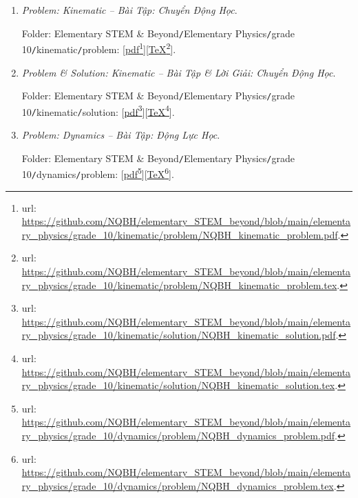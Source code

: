 \documentclass[12pt]{article}
\begin{document}
\begin{enumerate}
	\item {\it Problem: Kinematic -- Bài Tập: Chuyển Động Học}.
	
	Folder: {\sf Elementary STEM \& Beyond{\tt/}Elementary Physics{\tt/}grade 10{\tt/}kinematic{\tt/}problem}: [\href{https://github.com/NQBH/elementary_STEM_beyond/blob/main/elementary_physics/grade_10/kinematic/problem/NQBH_kinematic_problem.pdf}{pdf}\footnote{{\sc url}: \url{https://github.com/NQBH/elementary_STEM_beyond/blob/main/elementary_physics/grade_10/kinematic/problem/NQBH_kinematic_problem.pdf}.}][\href{https://github.com/NQBH/elementary_STEM_beyond/blob/main/elementary_physics/grade_10/kinematic/problem/NQBH_kinematic_problem.tex}{\TeX}\footnote{{\sc url}: \url{https://github.com/NQBH/elementary_STEM_beyond/blob/main/elementary_physics/grade_10/kinematic/problem/NQBH_kinematic_problem.tex}.}].
	\item {\it Problem \& Solution: Kinematic -- Bài Tập \& Lời Giải: Chuyển Động Học}.
	
	Folder: {\sf Elementary STEM \& Beyond{\tt/}Elementary Physics{\tt/}grade 10{\tt/}kinematic{\tt/}solution}: [\href{https://github.com/NQBH/elementary_STEM_beyond/blob/main/elementary_physics/grade_10/kinematic/solution/NQBH_kinematic_solution.pdf}{pdf}\footnote{{\sc url}: \url{https://github.com/NQBH/elementary_STEM_beyond/blob/main/elementary_physics/grade_10/kinematic/solution/NQBH_kinematic_solution.pdf}.}][\href{https://github.com/NQBH/elementary_STEM_beyond/blob/main/elementary_physics/grade_10/kinematic/solution/NQBH_kinematic_solution.tex}{\TeX}\footnote{{\sc url}: \url{https://github.com/NQBH/elementary_STEM_beyond/blob/main/elementary_physics/grade_10/kinematic/solution/NQBH_kinematic_solution.tex}.}].
	\item {\it Problem: Dynamics -- Bài Tập: Động Lực Học}.
	
	Folder: {\sf Elementary STEM \& Beyond{\tt/}Elementary Physics{\tt/}grade 10{\tt/}dynamics{\tt/}problem}: [\href{https://github.com/NQBH/elementary_STEM_beyond/blob/main/elementary_physics/grade_10/dynamics/problem/NQBH_dynamics_problem.pdf}{pdf}\footnote{{\sc url}: \url{https://github.com/NQBH/elementary_STEM_beyond/blob/main/elementary_physics/grade_10/dynamics/problem/NQBH_dynamics_problem.pdf}.}][\href{https://github.com/NQBH/elementary_STEM_beyond/blob/main/elementary_physics/grade_10/dynamics/problem/NQBH_dynamics_problem.tex}{\TeX}\footnote{{\sc url}: \url{https://github.com/NQBH/elementary_STEM_beyond/blob/main/elementary_physics/grade_10/dynamics/problem/NQBH_dynamics_problem.tex}.}].
	

\end{enumerate}
\end{document}

